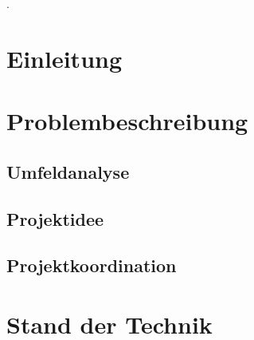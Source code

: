 \documentclass[12pt]{article}
\newcommand\blankpage{%
    \null
    \thispagestyle{empty}%
    \addtocounter{page}{-1}%
    \newpage}
\begin{document}
\newpage

\afterpage{\blankpage}



\newpage

\cfoot{}
{\small\color{white}.}
\vspace{-0.7cm}
\renewcommand*\contentsname{Inhalt}
\tableofcontents

\newpage %

\ofoot{\pagemark}

\section{Einleitung}
\label{sec:einleitung}


\newpage

\section{Problembeschreibung}
\label{sec:problembeschreibung}


\subsection{Umfeldanalyse}
\label{subsec:umfeldanalyse}


\newpage

\subsection{Projektidee}
\label{subsec:projektidee}


\subsection{Projektkoordination}
\label{subsec:projektkoordination}


\newpage

\section{Stand der Technik}
\label{sec:standdertechnik}

\end{document}
